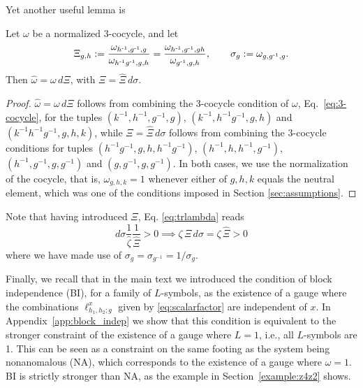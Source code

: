 \documentclass[reprint,
superscriptaddress,
amsmath,amssymb,
notitlepage,
aps,
prb,
10pt, 
tightenlines
]{revtex4-2}
\begin{document}
Yet another useful lemma is
\begin{lemma}
    Let $\omega$ be a normalized 3-cocycle, and let
    \begin{equation}
        \Xi_{g,h}:=\dfrac{\omega_{h^{\text{-}1}, g^{\text{-}1}, g}}{\omega_{h^{\text{-}1} g^{\text{-}1}, g, h}}=\dfrac{\omega_{h^{\text{-}1}, g^{\text{-}1}, gh}}{\omega_{g^{\text{-}1}, g, h}},\qquad \sigma_g:=\omega_{g,g^{\text{-}1}, g}.
        \label{eq:introXi}
    \end{equation}
    Then $\hat\omega=\omega\,d\Xi$, with $\Xi=\hat \Xi\,d\sigma$.
    \label{lemma:omegaXi}
\end{lemma}
\begin{proof}
    $\hat\omega=\omega\,d\Xi$ follows from combining the 3-cocycle condition of $\omega$, Eq.~\eqref{eq:3-cocycle}, for the tuples $(k^{-1}, h^{-1}, g^{-1}, g)$, $(k^{-1}, h^{-1} g^{-1}, g, h)$ and $(k^{-1}h^{-1}g^{-1}, g, h, k)$, while ${\Xi=\hat \Xi\,d\sigma}$ follows from combining the 3-cocycle conditions for tuples $(h^{-1}g^{-1}, g,h,h^{-1}g^{-1})$, $(h^{-1}, h,h^{-1}, g^{-1})$, $(h^{-1},g^{-1}, g,g^{-1})$ and $(g, g^{-1}, g, g^{-1})$. In both cases, we use the normalization of the cocycle, that is, $\omega_{g, h, k}=1$ whenever either of $g,h,k$ equals the neutral element, which was one of the conditions imposed in Section \ref{sec:assumptions}.
\end{proof}
Note that having introduced $\Xi$, Eq. \eqref{eq:trlambda} reads
\begin{equation}
    d\sigma \dfrac{1}{\hat\zeta}\dfrac{1}{\hat\Xi}>0\implies \zeta\,\Xi\,d\sigma=\zeta\,\hat\Xi>0
    \label{eq:positive_zeta}
\end{equation}
where we have made use of $\sigma_g = \sigma_{g^{-1}}=1/\sigma_g$.

Finally, we recall that in the main text we introduced the condition of block independence (BI), for a family of $L$-symbols, as the existence of a gauge where the combinations $\ell_{h_1,h_2;g}^x$ given by \eqref{eq:scalarfactor} are independent of $x$. In Appendix~\ref{app:block_indep} we show that this condition is equivalent to the stronger constraint of the existence of a gauge where $L=1$, i.e., all $L$-symbols are 1. This can be seen as a constraint on the same footing as the system being nonanomalous (NA), which corresponds to the existence of a gauge where $\omega = 1$. BI is strictly stronger than NA, as the example in Section~\ref{example:z4z2} shows.
\end{document}

